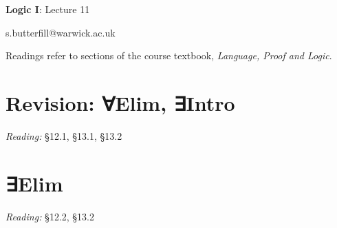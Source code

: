 \documentclass[12pt]{extarticle}
\date{}
\makeatletter
\def \ititle {Origins of Mind}
\def \isubtitle {Lecture 08}
\def \iemail{s.butterfill@warwick.ac.uk}
\makeatother
\begin{document}

\begin{multicols*}{3}

\setlength\footnotesep{1em}








\def \ititle {Logic I}
 
\def \isubtitle {Lecture 11}
 
\begin{center}
 
{\Large
 
\textbf{\ititle}: \isubtitle
 
}
 
 
 
\iemail %
 
\end{center}
 
Readings refer to sections of the course textbook, \emph{Language, Proof and Logic}.
 
 
 
\section{Revision: ∀Elim, ∃Intro}
 
\emph{Reading:} §12.1, §13.1, §13.2
 
 
 
\section{∃Elim}
 
\emph{Reading:} §12.2, §13.2
 

\end{multicols*}
\end{document}
